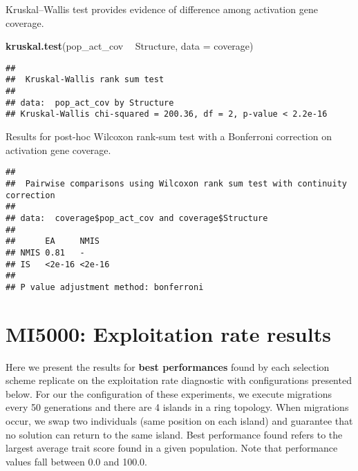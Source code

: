 \documentclass[]{book}
\newenvironment{Shaded}{\begin{snugshade}}{\end{snugshade}}
\newcommand{\DataTypeTok}[1]{\textcolor[rgb]{0.13,0.29,0.53}{#1}}
\newcommand{\KeywordTok}[1]{\textcolor[rgb]{0.13,0.29,0.53}{\textbf{#1}}}
\newcommand{\NormalTok}[1]{#1}
\newcommand{\OperatorTok}[1]{\textcolor[rgb]{0.81,0.36,0.00}{\textbf{#1}}}
\newcommand{\OtherTok}[1]{\textcolor[rgb]{0.56,0.35,0.01}{#1}}
\newcommand{\StringTok}[1]{\textcolor[rgb]{0.31,0.60,0.02}{#1}}
\begin{document}
Kruskal--Wallis test provides evidence of difference among activation gene coverage.

\begin{Shaded}
\begin{Highlighting}[]
\KeywordTok{kruskal.test}\NormalTok{(pop_act_cov }\OperatorTok{~}\StringTok{ }\NormalTok{Structure, }\DataTypeTok{data =}\NormalTok{ coverage)}
\end{Highlighting}
\end{Shaded}

\begin{verbatim}
## 
##  Kruskal-Wallis rank sum test
## 
## data:  pop_act_cov by Structure
## Kruskal-Wallis chi-squared = 200.36, df = 2, p-value < 2.2e-16
\end{verbatim}

Results for post-hoc Wilcoxon rank-sum test with a Bonferroni correction on activation gene coverage.

\begin{Shaded}
\end{Shaded}

\begin{verbatim}
## 
##  Pairwise comparisons using Wilcoxon rank sum test with continuity correction 
## 
## data:  coverage$pop_act_cov and coverage$Structure 
## 
##      EA     NMIS  
## NMIS 0.81   -     
## IS   <2e-16 <2e-16
## 
## P value adjustment method: bonferroni
\end{verbatim}

\hypertarget{mi5000-exploitation-rate-results}{%
\chapter{MI5000: Exploitation rate results}\label{mi5000-exploitation-rate-results}}

Here we present the results for \textbf{best performances} found by each selection scheme replicate on the exploitation rate diagnostic with configurations presented below.
For our the configuration of these experiments, we execute migrations every 50 generations and there are 4 islands in a ring topology.
When migrations occur, we swap two individuals (same position on each island) and guarantee that no solution can return to the same island.
Best performance found refers to the largest average trait score found in a given population.
Note that performance values fall between 0.0 and 100.0.
\end{document}

